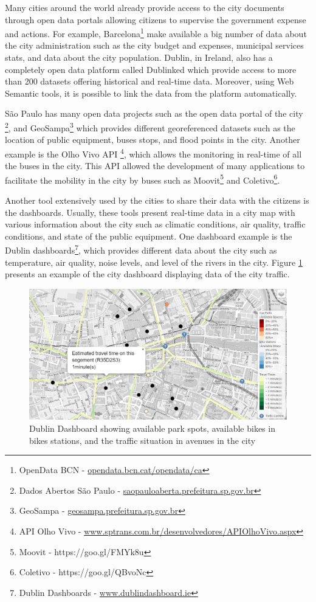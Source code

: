 Many cities around the world already provide access to the city documents through open data portals allowing citizens to supervise the government expense and actions. For example, Barcelona\footnote{OpenData BCN - \url{opendata.bcn.cat/opendata/ca}} make available a big number of data about the city administration such as the city budget and expenses, municipal services stats, and data about the city population. Dublin, in Ireland, also has a completely open data platform called Dublinked \cite{stephenson2012open} which provide access to more than 200 datasets offering historical and real-time data. Moreover, using Web Semantic tools, it is possible to link the data from the platform automatically.

S\~ao Paulo has many open data projects such as the open data portal of the city \footnote{Dados Abertos São Paulo - \url{saopauloaberta.prefeitura.sp.gov.br}}, and GeoSampa\footnote{GeoSampa - \url{geosampa.prefeitura.sp.gov.br}} which provides different georeferenced datasets such as the location of public equipment, buses stops, and flood points in the city. Another example is the Olho Vivo API \footnote{API Olho Vivo - \url{www.sptrans.com.br/desenvolvedores/APIOlhoVivo.aspx}}, which allows the monitoring in real-time of all the buses in the city. This API allowed the development of many applications to facilitate the mobility in the city by buses such as Moovit\footnote{Moovit - https://goo.gl/FMYk8u} and Coletivo\footnote{Coletivo - https://goo.gl/QBvoNc}.

Another tool extensively used by the cities to share their data with the citizens is the dashboards. Usually, these tools present real-time data in a city map with various information about the city such as climatic conditions, air quality, traffic conditions, and state of the public equipment. One dashboard example is the Dublin dashboards\footnote{Dublin Dashboards - \url{www.dublindashboard.ie}}, which provides different data about the city such as temperature, air quality, noise levels, and level of the rivers in the city. Figure \ref{figure:mapaDublin} presents an example of the city dashboard displaying data of the city traffic.

\begin{figure}[!htb]
\centering
\includegraphics[scale=0.5]{figuras/mapaDublin}
\caption{Dublin Dashboard showing available park spots, available bikes in bikes stations, and the traffic situation in avenues in the city}
\label{figure:mapaDublin}
\end{figure}

